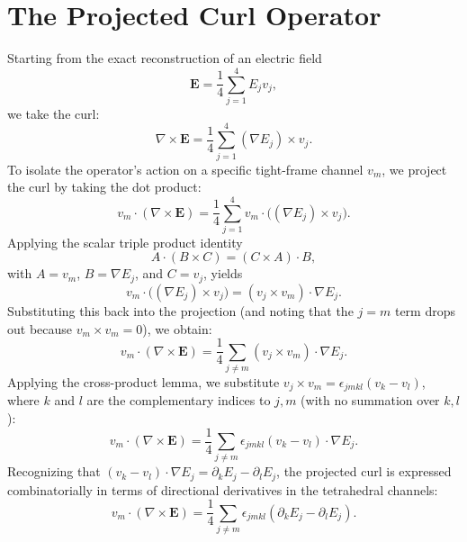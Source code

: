 \documentclass[11pt, letterpaper]{article}
\begin{document}
\section{The Projected Curl Operator}
Starting from the exact reconstruction of an electric field
\begin{equation}
    \mathbf{E} = \frac{1}{4} \sum_{j=1}^4 E_j v_j,
\end{equation}
we take the curl:
\begin{equation}
    \nabla \times \mathbf{E} = \frac{1}{4} \sum_{j=1}^4 (\nabla E_j) \times v_j.
\end{equation}
To isolate the operator's action on a specific tight-frame channel \(v_m\), we project the curl by taking the dot product:
\begin{equation}
    v_m \cdot (\nabla \times \mathbf{E}) = \frac{1}{4} \sum_{j=1}^4 v_m \cdot \big((\nabla E_j) \times v_j\big).
\end{equation}
Applying the scalar triple product identity
\begin{equation}
    A \cdot (B \times C) = (C \times A) \cdot B,
\end{equation}
with \(A = v_m\), \(B = \nabla E_j\), and \(C = v_j\), yields
\begin{equation}
    v_m \cdot \big((\nabla E_j) \times v_j\big) = (v_j \times v_m) \cdot \nabla E_j.
\end{equation}
Substituting this back into the projection (and noting that the \(j=m\) term drops out because \(v_m \times v_m = 0\)), we obtain:
\begin{equation}
    v_m \cdot (\nabla \times \mathbf{E}) = \frac{1}{4} \sum_{j \neq m} (v_j \times v_m) \cdot \nabla E_j.
\end{equation}
Applying the cross-product lemma, we substitute \(v_j \times v_m = \epsilon_{jmkl}(v_k - v_l)\), where \(k\) and \(l\) are the complementary indices to \(j,m\) (with no summation over \(k,l\)):
\begin{equation}
    v_m \cdot (\nabla \times \mathbf{E}) = \frac{1}{4} \sum_{j \neq m} \epsilon_{jmkl} (v_k - v_l) \cdot \nabla E_j.
\end{equation}
Recognizing that \((v_k - v_l) \cdot \nabla E_j = \partial_k E_j - \partial_l E_j\), the projected curl is expressed combinatorially in terms of directional derivatives in the tetrahedral channels:
\begin{equation}
    v_m \cdot (\nabla \times \mathbf{E}) = \frac{1}{4} \sum_{j \neq m} \epsilon_{jmkl} (\partial_k E_j - \partial_l E_j).
\end{equation}
\end{document}
